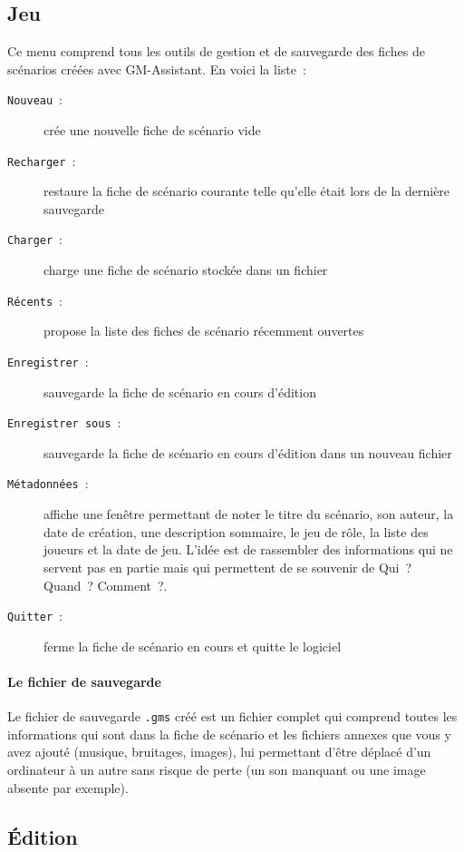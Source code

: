 \documentclass[a4paper,12pt]{article}
\newcommand*{\GMA}{GM-Assistant\xspace}
\newcommand*{\interfaceitem}[1]{\texttt{#1}}
\newcommand*{\guillemets}[1]{\og #1\fg{}\xspace}
\begin{document}
\subsection{Jeu}
\label{sec:jeu}

Ce menu comprend tous les outils de gestion et de sauvegarde des fiches de scénarios créées avec \GMA.
En voici la liste~:
\begin{description}
    \item[\interfaceitem{Nouveau}~:]{crée une nouvelle fiche de scénario vide}
    \item[\interfaceitem{Recharger}~:]{restaure la fiche de scénario courante telle qu'elle était lors de la dernière sauvegarde}
    \item[\interfaceitem{Charger}~:]{charge une fiche de scénario stockée dans un fichier}
    \item[\interfaceitem{Récents}~:]{propose la liste des fiches de scénario récemment ouvertes}
    \item[\interfaceitem{Enregistrer}~:]{sauvegarde la fiche de scénario en cours d'édition}
    \item[\interfaceitem{Enregistrer sous}~:]{sauvegarde la fiche de scénario en cours d'édition dans un nouveau fichier}
    \item[\interfaceitem{Métadonnées}~:]{affiche une fenêtre permettant de noter le titre du scénario, son auteur, la date de création, une description sommaire, le jeu de rôle, la liste des joueurs et la date de jeu.
            L'idée est de rassembler des informations qui ne servent pas en partie mais qui permettent de se souvenir de \guillemets{Qui~? Quand~? Comment~?}.}
    \item[\interfaceitem{Quitter}~:]{ferme la fiche de scénario en cours et quitte le logiciel}
\end{description}
\paragraph{Le fichier de sauvegarde}
Le fichier de sauvegarde \texttt{.gms} créé est un fichier complet qui comprend toutes les informations qui sont dans la fiche de scénario et les fichiers annexes que vous y avez ajouté (musique, bruitages, images), lui permettant d'être déplacé d'un ordinateur à un autre sans risque de perte (un son manquant ou une image absente par exemple).

\subsection{Édition}
\label{sec:edition}
\end{document}
